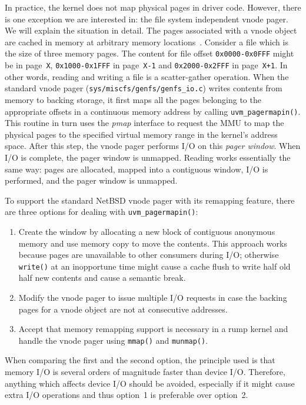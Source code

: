 In practice, the kernel does not map physical pages in driver code.
However, there is one exception we are interested in: the file
system independent vnode pager.  We will explain the situation in
detail.  The pages associated with a vnode object are cached in
memory at arbitrary memory locations~\cite{silvers:ubc}.  Consider
a file which is the size of three memory pages.  The content for
file offset \texttt{0x0000-0x0FFF} might be in page~\texttt{X},
\texttt{0x1000-0x1FFF} in page~\texttt{X-1} and
\texttt{0x2000-0x2FFF} in page~\texttt{X+1}.  In other words,
reading and writing a file is a scatter-gather operation.
When the standard vnode pager
(\verb+sys/miscfs/genfs/genfs_io.c+) writes contents from memory
to backing storage, it first maps all the pages belonging to the
appropriate offsets in a continuous memory address by calling
\verb+uvm_pagermapin()+.  This routine in turn uses the \textit{pmap}
interface to request the MMU to map the physical pages to the
specified virtual memory range in the kernel's address space.
After this step, the vnode pager performs I/O on this
\textit{pager window}.  When I/O is complete, the pager
window is unmapped.  Reading works essentially the same way:  pages
are allocated, mapped into a contiguous window, I/O is performed,
and the pager window is unmapped.

To support the standard NetBSD vnode pager with its remapping
feature, there are three options for dealing with \verb+uvm_pagermapin()+:

\begin{enumerate}
\item   Create the window by allocating a new block of contiguous
	anonymous memory and use memory copy to move the contents.
	This approach works because pages are unavailable to other consumers
	during I/O; otherwise \eg \texttt{write()} at an inopportune
	time might cause a cache flush to write half old half new
	contents and cause a semantic break.

\item   Modify the vnode pager to issue multiple I/O requests in
	case the backing pages for a vnode object are not at
	consecutive addresses.

\item   Accept that memory remapping support is necessary in a rump
	kernel and handle the vnode pager using \texttt{mmap()}
	and \texttt{munmap()}.
\end{enumerate}

When comparing the first and the second option, the principle used
is that memory I/O is several orders of magnitude faster than device
I/O.  Therefore, anything which affects device I/O should be avoided,
especially if it might cause extra I/O operations and thus option~1
is preferable over option~2.

